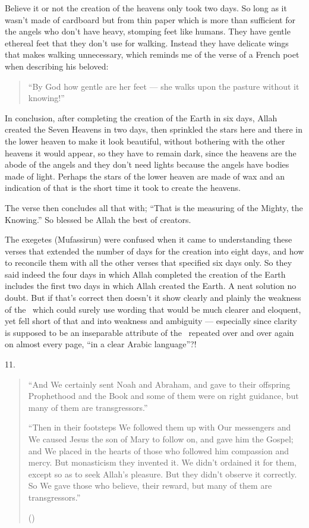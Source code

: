 \documentclass[12pt]{memoir}
\begin{document}
Believe it or not the creation of the heavens only took two days.
So long as it wasn’t made of cardboard but from thin paper
which is more than sufficient for the angels who don’t have heavy,
stomping feet like humans.
They have gentle ethereal feet that they don’t use for walking.
Instead they have delicate wings that makes walking unnecessary,
which reminds me of the verse of a French poet when describing his beloved:

\begin{quote}
“By God how gentle are her feet —
she walks upon the pasture without it knowing!”
\end{quote}

In conclusion, after completing the creation of the Earth in six days,
Allah created the Seven Heavens in two days, then sprinkled the stars
here and there in the lower heaven to make it look beautiful,
without bothering with the other heavens it would appear,
so they have to remain dark, since the heavens are the abode of the angels
and they don’t need lights because the angels have bodies made of light.
Perhaps the stars of the lower heaven are made of wax
and an indication of that is the short time it took to create the heavens.

The verse then concludes all that with;
“That is the measuring of the Mighty, the Knowing.”
So blessed be Allah the best of creators.

The exegetes (Mufassirun) were confused when it came to understanding
these verses that extended the number of days for the creation into eight days,
and how to reconcile them with all the other verses
that specified six days only.
So they said indeed the four days in which Allah completed
the creation of the Earth includes the first two days
in which Allah created the Earth.
A neat solution no doubt.
But if that’s correct then doesn’t it show clearly
and plainly the weakness of the \Quran\ which could surely use wording
that would be much clearer and eloquent,
yet fell short of that and into weakness and ambiguity —
especially since clarity is supposed to be an inseparable attribute
of the \Quran\ repeated over and over again on almost every page,
“in a clear Arabic language”?!

11.

\begin{quote}
“And We certainly sent Noah and Abraham,
and gave to their offspring Prophethood and the Book
and some of them were on right guidance, but many of them are transgressors.”

“Then in their footsteps We followed them up with Our messengers
and We caused Jesus the son of Mary to follow on, and gave him the Gospel;
and We placed in the hearts of those who followed him compassion and mercy.
But monasticism they invented it.
We didn’t ordained it for them, except so as to seek Allah’s pleasure.
But they didn’t observe it correctly.
So We gave those who believe, their reward,
but many of them are transgressors.”

()
\end{quote}
\end{document}
